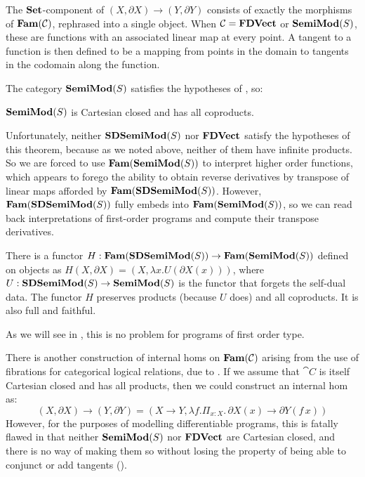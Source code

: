 The $\mathbf{Set}$-component of $(X, \partial X) \to (Y, \partial Y)$ consists
of exactly the morphisms of $\mathbf{Fam}(\mathcal{C})$, rephrased into a single
object. When $\mathcal{C} = \mathbf{FDVect}$ or $\mathbf{SemiMod}(S)$, these are functions with an
associated linear map at every point. A tangent to a function is then defined to be a mapping from
points in the domain to tangents in the codomain along the function.

The category $\mathbf{SemiMod}(S)$ satisfies the hypotheses of
, so:
\begin{corollary}
  $\mathbf{SemiMod}(S)$ is Cartesian closed and has all coproducts.
\end{corollary}
Unfortunately, neither $\mathbf{SDSemiMod}(S)$ nor
$\mathbf{FDVect}$ satisfy the hypotheses of this theorem, because as we noted
above, neither of them have infinite products. So we are forced to use
  $\mathbf{Fam}(\mathbf{SemiMod}(S))$ to interpret higher order functions, which
  appears to forego the ability to obtain reverse derivatives by
  transpose of linear maps afforded by $\mathbf{Fam}(\mathbf{SDSemiMod}(S))$. However,
  $\mathbf{Fam}(\mathbf{SDSemiMod}(S))$ fully embeds into $\mathbf{Fam}(\mathbf{SemiMod}(S))$, so we
  can read back interpretations of first-order programs and compute
  their transpose derivatives.

\begin{proposition}
  \label{prop:ho-embedding}
  There is a functor $H : \mathbf{Fam}(\mathbf{SDSemiMod}(S)) \to \mathbf{Fam}(\mathbf{SemiMod}(S))$
  defined on objects as
  $H(X, \partial X) = (X, \lambda x. U(\partial X(x)))$, where
  $U : \mathbf{SDSemiMod}(S) \to \mathbf{SemiMod}(S)$ is the functor that forgets the
  self-dual data. The functor $H$ preserves products (because $U$
  does) and all coproducts. It is also full and faithful.
\end{proposition}

As we will see in , this is no problem
  for programs of first order type.

\begin{remark}
  \label{rem:hermida-exponentials}
  There is another construction of internal homs on $\mathbf{Fam}(\mathcal{C})$
  arising from the use of fibrations for categorical logical
  relations, due to \citet[Corollary 4.12]{hermida99}. If we assume
  that $\cat{C}$ is itself Cartesian closed and has all products, then
  we could construct an internal hom as:
  \begin{displaymath}
    (X, \partial X) \to (Y, \partial Y) = (X \to Y, \lambda f. \Pi_{x : X}.\,\partial X(x) \to \partial Y(f\,x))
  \end{displaymath}
  However, for the purposes of modelling differentiable programs, this
  is fatally flawed in that neither $\mathbf{SemiMod}(S)$ nor $\mathbf{FDVect}$ are
  Cartesian closed, and there is no way of making them so without
  losing the property of being able to conjunct or add tangents
  ().
\end{remark}


